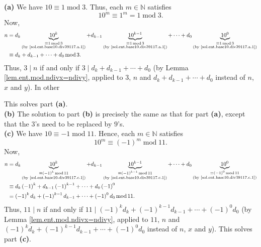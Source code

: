 \documentclass[paper=a4, fontsize=12pt]{scrartcl}%
\theoremstyle{plainsl}
\theoremstyle{definition}
\theoremstyle{remark}
\begin{document}
\textbf{(a)} We have $10\equiv1\operatorname{mod}3$. Thus, each $m\in
\mathbb{N}$ satisfies
\begin{equation}
10^{m}\equiv1^{m}=1\operatorname{mod}3.\label{sol.ent.base10.div39117.a.1}%
\end{equation}
Now,%
\begin{align*}
n &  =d_{k}\underbrace{10^{k}}_{\substack{\equiv1\operatorname{mod}%
3\\\text{(by \eqref{sol.ent.base10.div39117.a.1})}}}+d_{k-1}%
\underbrace{10^{k-1}}_{\substack{\equiv1\operatorname{mod}3\\\text{(by
\eqref{sol.ent.base10.div39117.a.1})}}}+\cdots+d_{0}\underbrace{10^{0}%
}_{\substack{\equiv1\operatorname{mod}3\\\text{(by
\eqref{sol.ent.base10.div39117.a.1})}}}\\
&  \equiv d_{k}+d_{k-1}+\cdots+d_{0}\operatorname{mod}3.
\end{align*}
Thus, $3\mid n$ if and only if $3\mid d_{k}+d_{k-1}+\cdots+d_{0}$ (by Lemma
\ref{lem.ent.mod.ndivx=ndivy}, applied to $3$, $n$ and $d_{k}+d_{k-1}%
+\cdots+d_{0}$ instead of $n$, $x$ and $y$). In other 

This solves part \textbf{(a)}. \\[0.4cm]

\textbf{(b)} The solution to part \textbf{(b)} is precisely the same as that
for part \textbf{(a)}, except that the $3$'s need to be replaced by $9$'s.
\\[0.4cm]

\textbf{(c)} We have $10\equiv-1\operatorname{mod}11$. Hence, each
$m\in\mathbb{N}$ satisfies
\begin{equation}
10^{m}\equiv\left(  -1\right)  ^{m}\operatorname{mod}%
11.\label{sol.ent.base10.div39117.c.1}%
\end{equation}
Now,%
\begin{align*}
n &  =d_{k}\underbrace{10^{k}}_{\substack{\equiv\left(  -1\right)
^{k}\operatorname{mod}11\\\text{(by \eqref{sol.ent.base10.div39117.c.1})}%
}}+d_{k-1}\underbrace{10^{k-1}}_{\substack{\equiv\left(  -1\right)
^{k-1}\operatorname{mod}11\\\text{(by \eqref{sol.ent.base10.div39117.c.1})}%
}}+\cdots+d_{0}\underbrace{10^{0}}_{\substack{\equiv\left(  -1\right)
^{0}\operatorname{mod}11\\\text{(by \eqref{sol.ent.base10.div39117.c.1})}}}\\
&  \equiv d_{k}\left(  -1\right)  ^{k}+d_{k-1}\left(  -1\right)  ^{k-1}%
+\cdots+d_{0}\left(  -1\right)  ^{0}\\
&  =\left(  -1\right)  ^{k}d_{k}+\left(  -1\right)  ^{k-1}d_{k-1}%
+\cdots+\left(  -1\right)  ^{0}d_{0}\operatorname{mod}11.
\end{align*}
Thus, $11\mid n$ if and only if $11\mid\left(  -1\right)  ^{k}d_{k}+\left(
-1\right)  ^{k-1}d_{k-1}+\cdots+\left(  -1\right)  ^{0}d_{0}$ (by Lemma
\ref{lem.ent.mod.ndivx=ndivy}, applied to $11$, $n$ and $\left(  -1\right)
^{k}d_{k}+\left(  -1\right)  ^{k-1}d_{k-1}+\cdots+\left(  -1\right)  ^{0}%
d_{0}$ instead of $n$, $x$ and $y$). This solves part \textbf{(c)}. \\[0.4cm]
\end{document}
